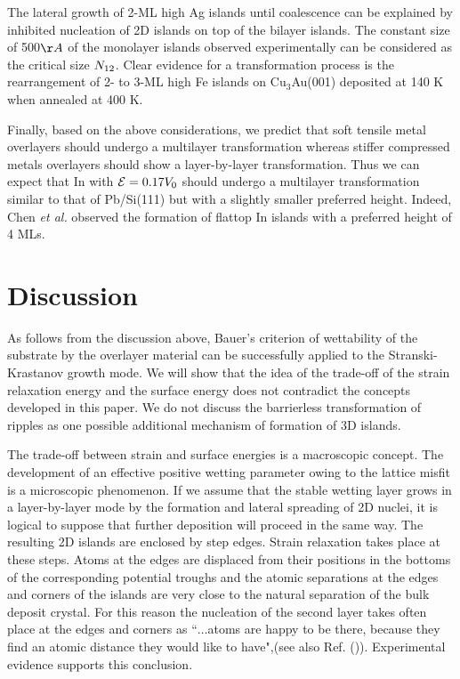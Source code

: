\documentclass[aps,prl,showpacs,twocolumn,byrevtex,floatfix]{revtex4-1}
\begin{document}
The lateral growth of 2-ML high Ag islands until coalescence\cite{Gavioli99} can
be explained by inhibited nucleation of 2D islands on top of the bilayer
islands. The constant size of 500$\AA$  of the monolayer islands observed
experimentally\cite{Su05} can be considered as the critical size $N_{\rm
12}$. Clear evidence for a transformation process is the rearrangement of 2- to
3-ML high Fe islands on Cu$_3$Au(001) deposited at 140 K when annealed at 400
K.\cite{Canepa00,Verdini02}

Finally, based on the above considerations, we predict that soft tensile metal
overlayers should undergo a multilayer transformation whereas stiffer compressed
metals overlayers should show a layer-by-layer transformation. Thus we can
expect that In with ${\cal E} = 0.17V_0$ should undergo a multilayer
transformation similar to that of Pb/Si(111) but with a slightly smaller 
preferred height. Indeed, Chen {\it et al.} observed the formation of 
flattop In islands with a preferred height of 4 MLs.\cite{Chen08}

\section{Discussion}

As follows from the discussion above, Bauer's criterion of wettability
of the substrate by the overlayer material can be successfully applied 
to the Stranski-Krastanov growth mode. 
We will show that the idea of the trade-off of the strain
relaxation energy and the surface energy does not contradict the concepts
developed in this paper. We do not discuss the barrierless transformation of
ripples as one possible additional mechanism of formation of 3D islands.

The trade-off between strain and surface energies is a macroscopic concept.
The development of an effective positive wetting parameter owing to the lattice
misfit is a microscopic phenomenon. If we assume that the stable wetting layer
grows in a layer-by-layer mode by the formation and lateral spreading of 
2D nuclei,
it is logical to suppose that further deposition will proceed in the same way.
The resulting 2D islands are enclosed by step edges. Strain relaxation takes
place at these steps. Atoms at the edges are displaced from their positions in
the bottoms of the corresponding potential troughs and the atomic separations at
the edges and corners of the islands are very close to the natural separation 
of the bulk deposit crystal. 
For this reason the nucleation of the second layer takes
often place at the edges and corners as ``$\hdots$atoms are happy to be there,
because they find an atomic distance they would like to
have",\cite{Villain05}(see also Ref. ()). Experimental
evidence supports this conclusion.\cite{Shi06,Murray95,Molina07}
\end{document}
